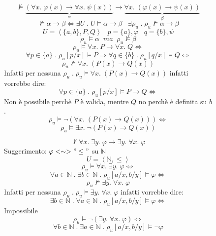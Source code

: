 \documentclass{article}
\theoremstyle{break}
\theoremstyle{break}
\theoremstyle{break}
\theoremstyle{break}
\begin{document}
  \begin{figure}[H]
    \begin{exercise}[a casa]
      \[
        \not\models \underbrace{(\forall x.\; \varphi (x) \to \forall x.\; \psi(x))}_{\alpha} \to \underbrace{\forall x.\; (\varphi(x) \to \psi(x))}_{\beta}
      \] 
      \[
        \not\models \alpha \to \beta \Leftrightarrow \exists U \;.\; U \models \alpha \to \beta \;\;\; \exists \rho_u \;.\; \rho_u \not\models \alpha \to \beta
      \] 
      \[
        U = \left<\{a,b\}, P, Q\right> \;\;\; p = \{a\} , \varphi  \;\;\; q = \{b\} , \psi 
      \]
      \[
        \rho_u \models \alpha \;\; ma \;\; \rho_u \not\models \beta
      \]
      \[
        \rho_u \models \forall x.\; P \to \forall x.\; Q \Leftrightarrow
      \] 
      \[
        \forall p \in \{a\} \;.\; \rho_u[p/x] \models P \Rightarrow \forall q \in \{b\} \;.\; \rho_u[q/x] \models Q \Leftrightarrow
      \] 
      \[
        \rho_u \not\models \forall x.\; (P(x) \to Q(x))
      \] 
      Infatti per nessuna \( \rho_u \;.\; \rho_u \models \forall x.\; (P(x) \to Q(x)) \) infatti vorrebbe dire:
      \[
        \forall p \in \{a\} \;.\; \rho_u[p/x] \models P \to Q \Leftrightarrow
      \] 
      Non è possibile perchè \( P \) è valida, mentre \( Q \) no perchè è definita su \( b \).
      \[
        \rho_u \models \neg(\forall x.\; (P(x) \to Q(x))) \Leftrightarrow
      \] 
      \[
        \rho_u \models \exists x.\; \neg(P(x) \to Q(x)) 
      \] 
    \end{exercise}
  \end{figure}

  \begin{figure}[H]
    \begin{exercise}[a casa]
      \[
        \not\vdash \forall x.\; \exists y.\; \varphi \to \exists y.\; \forall x.\; \varphi
      \] 
      Suggerimento: \( \varphi <\sim> "\le" \) su \( \mathbb{N} \) 
      \[
        U = \left<\mathbb{N}, \le\right>
      \]
      \[
        \rho_u \models \forall x.\; \exists y.\; \varphi  \Leftrightarrow
      \]
      \[
        \forall a \in \mathbb{N} \;.\; \exists b \in \mathbb{N} \;.\; \rho_u[a/x, b/y] \models \varphi  \Leftrightarrow
      \]
      \[
        \rho_u \not\models \exists y.\; \forall x.\; \varphi 
      \]
      Infatti per nessuna \( \rho_u \;.\; \rho_u \models \exists y.\; \forall x.\; \varphi  \) infatti vorrebbe dire:
      \[
        \exists b \in \mathbb{N} \;.\; \forall a \in \mathbb{N} \;.\; \rho_u[a/x, b/y] \models \varphi  \Leftrightarrow
      \]
      Impossibile
      \[
        \rho_u \models \neg(\exists y.\; \forall x.\; \varphi ) \Leftrightarrow
      \]
      \[
        \forall b \in \mathbb{N} \;.\; \exists a \in \mathbb{N} \;.\; \rho_u[a/x, b/y] \models \neg \varphi
      \]
    \end{exercise}
  \end{figure}
\end{document}
